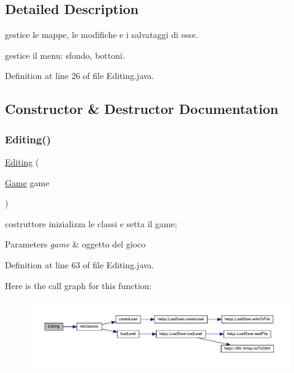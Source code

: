 \subsection{Detailed Description}
gestice le mappe, le modifiche e i salvataggi di esse. 

gestice il menu\+: sfondo, bottoni. 

Definition at line 26 of file Editing.\+java.



\subsection{Constructor \& Destructor Documentation}
\mbox{\label{classscenes_1_1_editing_a2ca3ef24637fa4a614988adee4b8689d}} 
\subsubsection{\texorpdfstring{Editing()}{Editing()}}
{\footnotesize\ttfamily \hyperlink{classscenes_1_1_editing}{Editing} (\begin{DoxyParamCaption}\item[{\hyperlink{classprogetto_1_1_game}{Game}}]{game }\end{DoxyParamCaption})}



costruttore inizializza le classi e setta il game; 


\begin{DoxyParams}{Parameters}
{\em game} & oggetto del gioco \\
\hline
\end{DoxyParams}


Definition at line 63 of file Editing.\+java.

Here is the call graph for this function\+:
\nopagebreak
\begin{figure}[H]
\begin{center}
\leavevmode
\includegraphics[width=350pt]{classscenes_1_1_editing_a2ca3ef24637fa4a614988adee4b8689d_cgraph}
\end{center}
\end{figure}


